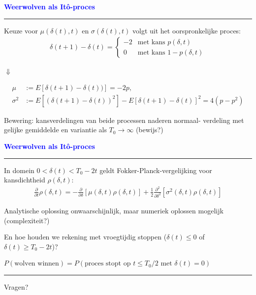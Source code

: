 \documentclass{beamer}
\def\lbt{} %
\newenvironment{dia}[2]
{
	\begin{frame}
	\vspace{1mm}
	{\small #1}
	\hfill
    {\small\bf\textcolor{blue}{#2}}
	\vspace{3mm}
	\hrule
	\bigskip
}
{
	\vfill
	\end{frame}
}
\begin{document}
\begin{dia}{\lbt}{Weerwolven als Itô-proces}
Keuze voor $\mu(\delta(t), t)$ en $\sigma(\delta(t), t)$ volgt uit het oorspronkelijke proces: \pause
\begin{align*}
    \delta(t + 1) - \delta(t) = \begin{cases}
        -2 & \text{met kans } p(\delta, t) \\
         0 & \text{met kans } 1 - p(\delta, t)
    \end{cases}
\end{align*}
\pause \vspace{-3mm}
\begin{center}
    $\Downarrow$\vspace{-2mm}
\end{center}
\begin{align*}
    \mu &:= E[\delta(t + 1) - \delta(t))] = -2p, \\[2mm]
    \sigma^2 &:= E[(\delta(t + 1) - \delta(t))^2] - E[\delta(t + 1) - \delta(t)]^2 = 4(p - p^2)
\end{align*}
\vspace{-2mm}

\pause Bewering: kansverdelingen van beide processen naderen normaal- verdeling met gelijke gemiddelde en variantie als $T_0 \rightarrow \infty$ (bewijs?)

\vspace{-1.4cm}
\end{dia}

\begin{dia}{\lbt}{Weerwolven als Itô-proces}
In domein $0 < \delta(t) < T_0 - 2t$ geldt Fokker-Planck-vergelijking voor kansdichtheid $\rho(\delta, t)$: \pause
\begin{align*}
    \frac{\partial}{\partial t} \rho(\delta, t) = -\frac{\partial}{\partial \delta}\left[\mu(\delta, t) \rho(\delta, t)\right] + \frac12 \frac{\partial^2}{\partial \delta^2}\left[\sigma^2(\delta, t) \rho(\delta, t)\right]
\end{align*} \smallskip

\pause Analytische oplossing onwaarschijnlijk, maar numeriek oplossen mogelijk (complexiteit?) \pause \bigskip

En hoe houden we rekening met vroegtijdig stoppen ($\delta(t) \leq 0$ of $\delta(t) \geq T_0 - 2t$)? \pause \bigskip

$P(\text{wolven winnen}) = P(\text{proces stopt op } t \leq T_0 / 2 \text{ met } \delta(t) = 0)$
\vspace{-1.2cm}
\end{dia}

\begin{dia}{\lbt}{}
\vspace{2.5cm}
\begin{center}
\begin{LARGE}
\textcolor{mygreen}{Vragen?}
\end{LARGE}
\end{center}
\vspace*{1.5cm}
\end{dia}
\end{document}
